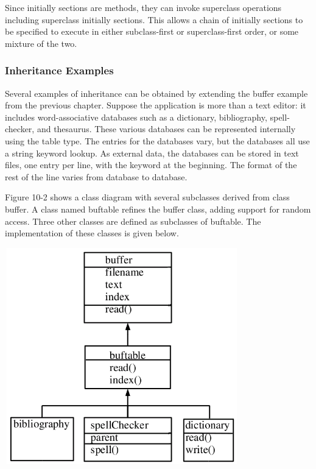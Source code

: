 Since initially sections are methods, they can invoke superclass
operations including superclass initially sections. This allows a chain
of initially sections to be specified to execute in either
subclass-first or superclass-first order, or some mixture of the two. 

\subsubsection[Inheritance Examples]{Inheritance Examples}

Several examples of inheritance can be obtained by extending the buffer
example from the previous chapter. Suppose the application is more than
a text editor: it includes word-associative databases
such as a dictionary, bibliography, spell-checker, and thesaurus. These
various databases can be represented internally using the table type.
The entries for the databases vary, but the databases all use a string
keyword lookup. As external data, the databases can be stored in text
files, one entry per line, with the keyword at the beginning. The
format of the rest of the line varies from database to database.

Figure 10-2 shows a class diagram with several subclasses derived from
class \textsf{buffer}. A class named \textsf{buftable} refines the
buffer class, adding support for random access. Three other classes are
defined as subclasses of \textsf{buftable}. The implementation of these
classes is given below.


\begin{center}
\includegraphics[width=4in,height=3.7in]{ub-img/ub-img43.png}
\end{center}

